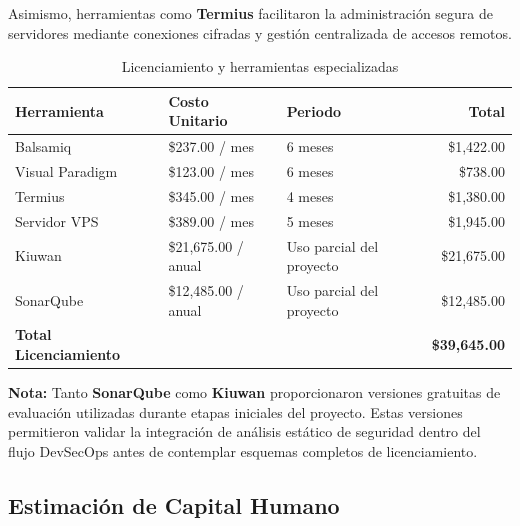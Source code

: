 \documentclass[12pt,oneside,letterpaper]{book}
\begin{document}
Asimismo, herramientas como \textbf{Termius} facilitaron la administración segura de servidores mediante conexiones cifradas y gestión centralizada de accesos remotos.

\begin{table}[H]
\centering
\caption{Licenciamiento y herramientas especializadas}

\begin{tabular}{p{4cm} p{4cm} p{4cm} r}
\toprule
\rowcolor{headerblue}
\textbf{Herramienta} & \textbf{Costo Unitario} & \textbf{Periodo} & \textbf{Total} \\
\midrule

Balsamiq &
\$237.00 / mes &
6 meses &
\$1,422.00 \\

Visual Paradigm &
\$123.00 / mes &
6 meses &
\$738.00 \\

Termius &
\$345.00 / mes &
4 meses &
\$1,380.00 \\

Servidor VPS &
\$389.00 / mes &
5 meses &
\$1,945.00 \\

Kiuwan &
\$21,675.00 / anual &
Uso parcial del proyecto &
\$21,675.00 \\

SonarQube &
\$12,485.00 / anual &
Uso parcial del proyecto &
\$12,485.00 \\

\midrule
\textbf{Total Licenciamiento} & & & \textbf{\$39,645.00} \\

\bottomrule
\end{tabular}
\end{table}

\vspace{0.3cm}

\noindent
\textbf{Nota:} Tanto \textbf{SonarQube} como \textbf{Kiuwan} proporcionaron versiones gratuitas de evaluación utilizadas durante etapas iniciales del proyecto. Estas versiones permitieron validar la integración de análisis estático de seguridad dentro del flujo DevSecOps antes de contemplar esquemas completos de licenciamiento.

\vspace{0.5cm}

\subsection{Estimación de Capital Humano}
\end{document}

